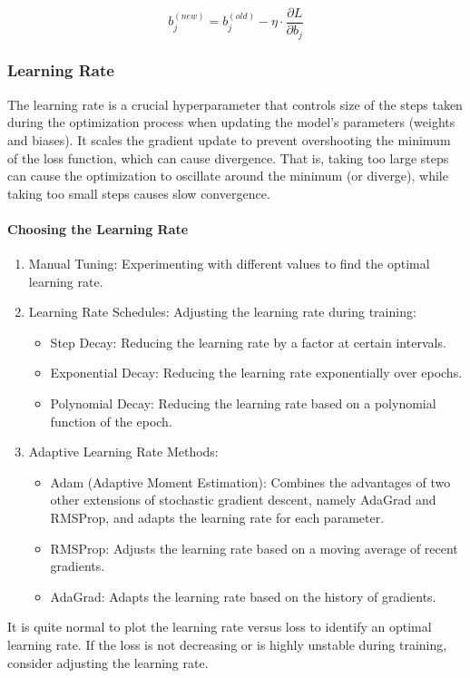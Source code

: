 \documentclass{article}
\begin{document}
\[ 
b_{j}^{(new)} = b_{j}^{(old)} - \eta \cdot \frac{\partial L}{\partial b_{j}} 
\]

\subsubsection*{Learning Rate}
The learning rate is a crucial hyperparameter that controls size of the steps taken during the optimization process when updating the model's parameters (weights and biases). It scales the gradient update to prevent overshooting the minimum of the loss function, which can cause divergence. That is, taking too large steps can cause the optimization to oscillate around the minimum (or diverge), while taking too small steps causes slow convergence. 

\paragraph{Choosing the Learning Rate}
\begin{enumerate}
    \item Manual Tuning: Experimenting with different values to find the optimal learning rate.
    \item Learning Rate Schedules: Adjusting the learning rate during training:
    \begin{itemize}
        \item Step Decay: Reducing the learning rate by a factor at certain intervals.
        \item Exponential Decay: Reducing the learning rate exponentially over epochs.
        \item Polynomial Decay: Reducing the learning rate based on a polynomial function of the epoch.
    \end{itemize}
    \item Adaptive Learning Rate Methods:
    \begin{itemize}
        \item Adam (Adaptive Moment Estimation): Combines the advantages of two other extensions of stochastic gradient descent, namely AdaGrad and RMSProp, and adapts the learning rate for each parameter.
        \item RMSProp: Adjusts the learning rate based on a moving average of recent gradients.
        \item AdaGrad: Adapts the learning rate based on the history of gradients.
    \end{itemize}
\end{enumerate}
It is quite normal to plot the learning rate versus loss to identify an optimal learning rate. If the loss is not decreasing or is highly unstable during training, consider adjusting the learning rate.
\end{document}
